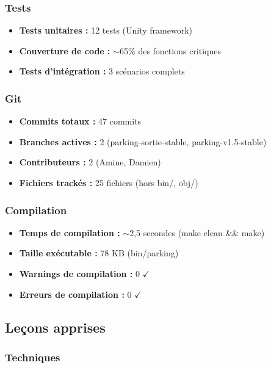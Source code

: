 \documentclass[12pt,a4paper]{article}
\begin{document}
\subsubsection{Tests}
\begin{itemize}
    \item \textbf{Tests unitaires :} 12 tests (Unity framework)
    \item \textbf{Couverture de code :} $\sim$65\% des fonctions critiques
    \item \textbf{Tests d'intégration :} 3 scénarios complets
\end{itemize}

\subsubsection{Git}
\begin{itemize}
    \item \textbf{Commits totaux :} 47 commits
    \item \textbf{Branches actives :} 2 (parking-sortie-stable, parking-v1.5-stable)
    \item \textbf{Contributeurs :} 2 (Amine, Damien)
    \item \textbf{Fichiers trackés :} 25 fichiers (hors bin/, obj/)
\end{itemize}

\subsubsection{Compilation}
\begin{itemize}
    \item \textbf{Temps de compilation :} $\sim$2,5 secondes (make clean \&\& make)
    \item \textbf{Taille exécutable :} 78 KB (bin/parking)
    \item \textbf{Warnings de compilation :} 0 $\checkmark$
    \item \textbf{Erreurs de compilation :} 0 $\checkmark$
\end{itemize}

\subsection{Leçons apprises}

\subsubsection{Techniques}
\end{document}
